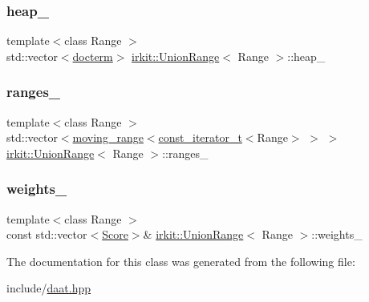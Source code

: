 \subsubsection{\texorpdfstring{heap\+\_\+}{heap\_}}
{\footnotesize\ttfamily template$<$class Range $>$ \\
std\+::vector$<$\hyperlink{structirkit_1_1UnionRange_1_1docterm}{docterm}$>$ \hyperlink{classirkit_1_1UnionRange}{irkit\+::\+Union\+Range}$<$ Range $>$\+::heap\+\_\+\hspace{0.3cm}{\ttfamily [protected]}}

\mbox{\label{classirkit_1_1UnionRange_acb9b9e969f1c90bb18bf1e4eb99f124b}} 
\subsubsection{\texorpdfstring{ranges\+\_\+}{ranges\_}}
{\footnotesize\ttfamily template$<$class Range $>$ \\
std\+::vector$<$\hyperlink{structirkit_1_1moving__range}{moving\+\_\+range}$<$\hyperlink{namespaceirkit_a4b1668583041117eb42c1b5a1091b804}{const\+\_\+iterator\+\_\+t}$<$Range$>$ $>$ $>$ \hyperlink{classirkit_1_1UnionRange}{irkit\+::\+Union\+Range}$<$ Range $>$\+::ranges\+\_\+\hspace{0.3cm}{\ttfamily [protected]}}

\mbox{\label{classirkit_1_1UnionRange_a0c53eb9b1c9e8aa18621f4c129a6ff90}} 
\subsubsection{\texorpdfstring{weights\+\_\+}{weights\_}}
{\footnotesize\ttfamily template$<$class Range $>$ \\
const std\+::vector$<$\hyperlink{classirkit_1_1UnionRange_a47fb098a85581f5e33f4203e16245dae}{Score}$>$\& \hyperlink{classirkit_1_1UnionRange}{irkit\+::\+Union\+Range}$<$ Range $>$\+::weights\+\_\+\hspace{0.3cm}{\ttfamily [protected]}}



The documentation for this class was generated from the following file\+:\begin{DoxyCompactItemize}
\item 
include/\hyperlink{daat_8hpp}{daat.\+hpp}\end{DoxyCompactItemize}
